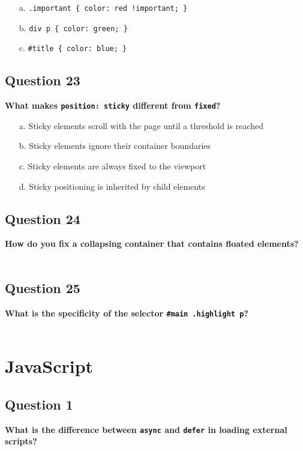 \documentclass{article}
\begin{document}
\begin{itemize}
  \item[a.] \texttt{.important \{ color: red !important; \}}
  \item[b.] \texttt{div p \{ color: green; \}}
  \item[c.] \texttt{\#title \{ color: blue; \}}
\end{itemize}

\subsection*{Question 23}
\textbf{What makes \texttt{position: sticky} different from \texttt{fixed}?}

\begin{itemize}
  \item[a.] Sticky elements scroll with the page until a threshold is reached
  \item[b.] Sticky elements ignore their container boundaries
  \item[c.] Sticky elements are always fixed to the viewport
  \item[d.] Sticky positioning is inherited by child elements
\end{itemize}

\subsection*{Question 24}
\textbf{How do you fix a collapsing container that contains floated elements?} \\ \\
\framebox[10cm][l]{\rule{0pt}{1.5ex}}

\subsection*{Question 25}
\textbf{What is the specificity of the selector \texttt{\#main .highlight p}?} \\ \\
\framebox[10cm][l]{\rule{0pt}{1.5ex}}


\section{JavaScript}

\subsection*{Question 1}
\textbf{What is the difference between \texttt{async} and \texttt{defer} in loading external scripts?}
\end{document}
